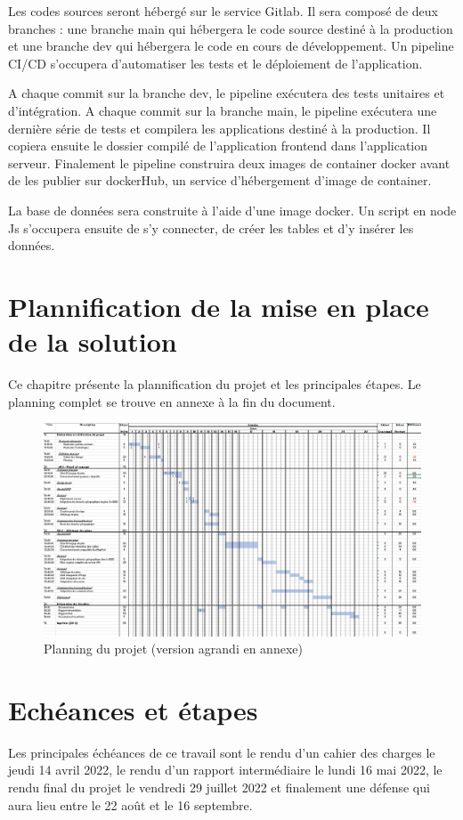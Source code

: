 \documentclass[
    iai, %
    il, %
]{heig-tb}
\begin{document}
Les codes sources seront hébergé sur le service Gitlab. Il sera composé de deux branches :
une branche main qui hébergera le code source destiné à la production et une branche dev qui hébergera le code en cours de développement.
Un pipeline CI/CD s'occupera d'automatiser les tests et le déploiement de l'application.

A chaque commit sur la branche dev, le pipeline exécutera des tests unitaires et d'intégration.
A chaque commit sur la branche main, le pipeline exécutera une dernière série de tests et
compilera les applications destiné à la production.
Il copiera ensuite le dossier compilé de l'application frontend dans l'application serveur.
Finalement le pipeline construira deux images de container docker avant de les publier sur dockerHub, un service d'hébergement d'image de container.

La base de données sera construite à l'aide d'une image docker.
Un script en node Js s'occupera ensuite de s'y connecter, de créer les tables et d'y insérer les données.

\section{Plannification de la mise en place de la solution}
Ce chapitre présente la plannification du projet et les principales étapes.
Le planning complet se trouve en annexe à la fin du document.

\begin{figure}[H]
    \caption{Planning du projet (version agrandi en annexe)}
    \centering
    \includegraphics[scale=0.5]{planning.png}
\end{figure}

\section{Echéances et étapes}
Les principales échéances de ce travail sont le rendu d'un cahier des charges le jeudi 14 avril 2022,
le rendu d'un rapport intermédiaire le lundi 16 mai 2022,
le rendu final du projet le vendredi 29 juillet 2022 et
finalement une défense qui aura lieu entre le 22 août et le 16 septembre.
\end{document}

